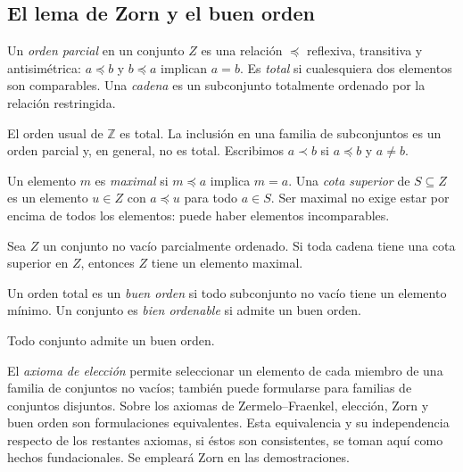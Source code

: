 \subsection{El lema de Zorn y el buen orden}
\begin{defi}
Un \emph{orden parcial} en un conjunto $Z$ es una relación $\preceq$ reflexiva, transitiva y antisimétrica: $a\preceq b$ y $b\preceq a$ implican $a=b$. Es \emph{total} si cualesquiera dos elementos son comparables. Una \emph{cadena} es un subconjunto totalmente ordenado por la relación restringida.
\end{defi}
El orden usual de $\mathbb Z$ es total. La inclusión en una familia de subconjuntos es un orden parcial y, en general, no es total. Escribimos $a\prec b$ si $a\preceq b$ y $a\ne b$.

Un elemento $m$ es \emph{maximal} si $m\preceq a$ implica $m=a$. Una \emph{cota superior} de $S\subseteq Z$ es un elemento $u\in Z$ con $a\preceq u$ para todo $a\in S$. Ser maximal no exige estar por encima de todos los elementos: puede haber elementos incomparables.

\begin{lema}[Zorn]\label{lema:C17-Zorn}
Sea $Z$ un conjunto no vacío parcialmente ordenado. Si toda cadena tiene una cota superior en $Z$, entonces $Z$ tiene un elemento maximal.
\end{lema}
\begin{defi}
Un orden total es un \emph{buen orden} si todo subconjunto no vacío tiene un elemento mínimo. Un conjunto es \emph{bien ordenable} si admite un buen orden.
\end{defi}
\begin{teo}
Todo conjunto admite un buen orden.
\end{teo}
El \emph{axioma de elección} permite seleccionar un elemento de cada miembro de una familia de conjuntos no vacíos; también puede formularse para familias de conjuntos disjuntos. Sobre los axiomas de Zermelo--Fraenkel, elección, Zorn y buen orden son formulaciones equivalentes. Esta equivalencia y su independencia respecto de los restantes axiomas, si éstos son consistentes, se toman aquí como hechos fundacionales. Se empleará Zorn en las demostraciones.

